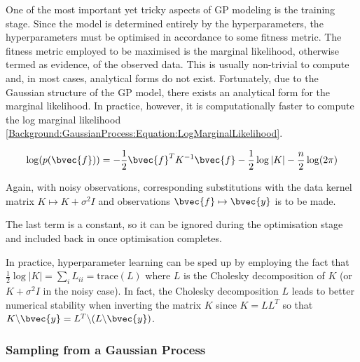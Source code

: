 				One of the most important yet tricky aspects of GP modeling is the training stage. Since the model is determined entirely by the hyperparameters, the hyperparameters must be optimised in accordance to some fitness metric. The fitness metric employed to be maximised is the marginal likelihood, otherwise termed as evidence, of the observed data. This is usually non-trivial to compute and, in most cases, analytical forms do not exist. Fortunately, due to the Gaussian structure of the GP model, there exists an analytical form for the marginal likelihood. In practice, however, it is computationally faster to compute the log marginal likelihood \eqref{Background:GaussianProcess:Equation:LogMarginalLikelihood}.
				
				\begin{equation}
					\log(p(\bvec{f})) = - \frac{1}{2} \bvec{f}^{T} K^{-1} \bvec{f} - \frac{1}{2} \log|K| - \frac{n}{2} \log(2 \pi)
				\label{Background:GaussianProcess:Equation:LogMarginalLikelihood}
				\end{equation}
				
				Again, with noisy observations, corresponding substitutions with the data kernel matrix $K \mapsto K + \sigma^{2} I$ and observations $\bvec{f} \mapsto \bvec{y}$ is to be made.
				
				The last term is a constant, so it can be ignored during the optimisation stage and included back in once optimisation completes.
				
				In practice, hyperparameter learning can be sped up by employing the fact that $\frac{1}{2} \log|K| = \sum_{i} L_{ii} = \mathrm{trace}(L)$ where $L$ is the Cholesky decomposition of $K$ (or $K + \sigma^{2} I$ in the noisy case). In fact, the Cholesky decomposition $L$ leads to better numerical stability when inverting the matrix $K$ since $K = LL^{T}$ so that $K \backslash \bvec{y} = L^{T} \backslash (L \backslash \bvec{y})$.
			
			\subsubsection{Sampling from a Gaussian Process}
			\label{Background:GaussianProcess:Regression:Sampling}
			
